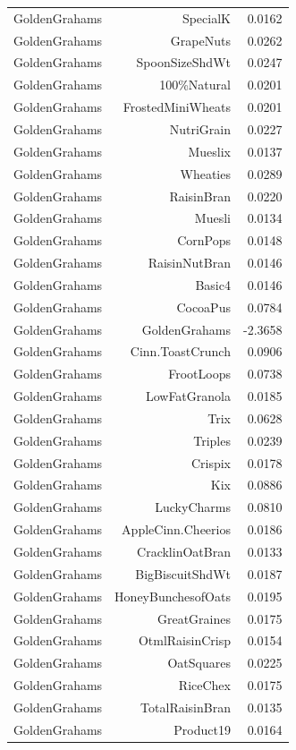 \begin{longtable}{@{}lrr@{}}
GoldenGrahams & SpecialK & 0.0162 \\
GoldenGrahams & GrapeNuts & 0.0262 \\
GoldenGrahams & SpoonSizeShdWt & 0.0247 \\
GoldenGrahams & 100\%Natural & 0.0201 \\
GoldenGrahams & FrostedMiniWheats & 0.0201 \\
GoldenGrahams & NutriGrain & 0.0227 \\
GoldenGrahams & Mueslix & 0.0137 \\
GoldenGrahams & Wheaties & 0.0289 \\
GoldenGrahams & RaisinBran & 0.0220 \\
GoldenGrahams & Muesli & 0.0134 \\
GoldenGrahams & CornPops & 0.0148 \\
GoldenGrahams & RaisinNutBran & 0.0146 \\
GoldenGrahams & Basic4 & 0.0146 \\
GoldenGrahams & CocoaPus & 0.0784 \\
GoldenGrahams & GoldenGrahams & -2.3658 \\
GoldenGrahams & Cinn.ToastCrunch & 0.0906 \\
GoldenGrahams & FrootLoops & 0.0738 \\
GoldenGrahams & LowFatGranola & 0.0185 \\
GoldenGrahams & Trix & 0.0628 \\
GoldenGrahams & Triples & 0.0239 \\
GoldenGrahams & Crispix & 0.0178 \\
GoldenGrahams & Kix & 0.0886 \\
GoldenGrahams & LuckyCharms & 0.0810 \\
GoldenGrahams & AppleCinn.Cheerios & 0.0186 \\
GoldenGrahams & CracklinOatBran & 0.0133 \\
GoldenGrahams & BigBiscuitShdWt & 0.0187 \\
GoldenGrahams & HoneyBunchesofOats & 0.0195 \\
GoldenGrahams & GreatGraines & 0.0175 \\
GoldenGrahams & OtmlRaisinCrisp & 0.0154 \\
GoldenGrahams & OatSquares & 0.0225 \\
GoldenGrahams & RiceChex & 0.0175 \\
GoldenGrahams & TotalRaisinBran & 0.0135 \\
GoldenGrahams & Product19 & 0.0164 \\

\end{longtable}
